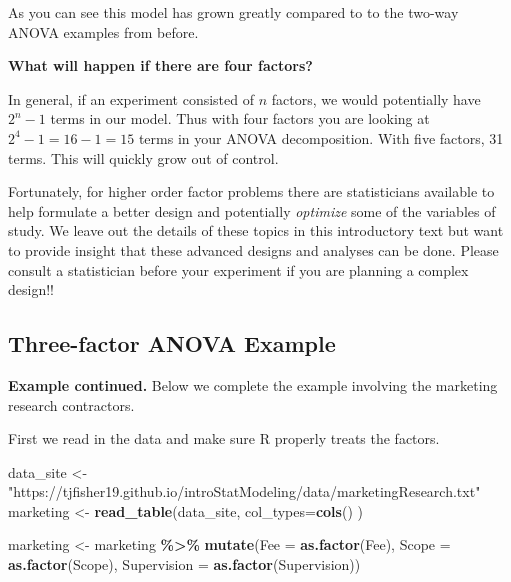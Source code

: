\documentclass[
]{book}
\newenvironment{Shaded}{\begin{snugshade}}{\end{snugshade}}
\newcommand{\AttributeTok}[1]{\textcolor[rgb]{0.13,0.29,0.53}{#1}}
\newcommand{\FunctionTok}[1]{\textcolor[rgb]{0.13,0.29,0.53}{\textbf{#1}}}
\newcommand{\NormalTok}[1]{#1}
\newcommand{\OtherTok}[1]{\textcolor[rgb]{0.56,0.35,0.01}{#1}}
\newcommand{\SpecialCharTok}[1]{\textcolor[rgb]{0.81,0.36,0.00}{\textbf{#1}}}
\newcommand{\StringTok}[1]{\textcolor[rgb]{0.31,0.60,0.02}{#1}}
\begin{document}
As you can see this model has grown greatly compared to to the two-way ANOVA examples from before.

\textbf{What will happen if there are four factors?}

In general, if an experiment consisted of \(n\) factors, we would potentially have \(2^n - 1\) terms in our model.
Thus with four factors you are looking at \(2^4 - 1 = 16-1=15\) terms in your ANOVA decomposition.
With five factors, 31 terms.
This will quickly grow out of control.

Fortunately, for higher order factor problems there are statisticians available to help formulate a better design and potentially \emph{optimize} some of the variables of study.
We leave out the details of these topics in this introductory text but want to provide insight that these advanced designs and analyses can be done.
Please consult a statistician before your experiment if you are planning a complex design!!

\hypertarget{three-factor-anova-example}{%
\subsection{Three-factor ANOVA Example}\label{three-factor-anova-example}}

\textbf{Example continued.} Below we complete the example involving the marketing research contractors.

First we read in the data and make sure R properly treats the factors.

\begin{Shaded}
\begin{Highlighting}[]
\NormalTok{data\_site }\OtherTok{\textless{}{-}} \StringTok{"https://tjfisher19.github.io/introStatModeling/data/marketingResearch.txt"}
\NormalTok{marketing }\OtherTok{\textless{}{-}} \FunctionTok{read\_table}\NormalTok{(data\_site, }\AttributeTok{col\_types=}\FunctionTok{cols}\NormalTok{() )}
\end{Highlighting}
\end{Shaded}

\begin{Shaded}
\begin{Highlighting}[]
\NormalTok{marketing }\OtherTok{\textless{}{-}}\NormalTok{ marketing }\SpecialCharTok{\%\textgreater{}\%}
  \FunctionTok{mutate}\NormalTok{(}\AttributeTok{Fee =} \FunctionTok{as.factor}\NormalTok{(Fee),}
         \AttributeTok{Scope =} \FunctionTok{as.factor}\NormalTok{(Scope),}
         \AttributeTok{Supervision =} \FunctionTok{as.factor}\NormalTok{(Supervision))}
\end{Highlighting}
\end{Shaded}
\end{document}
